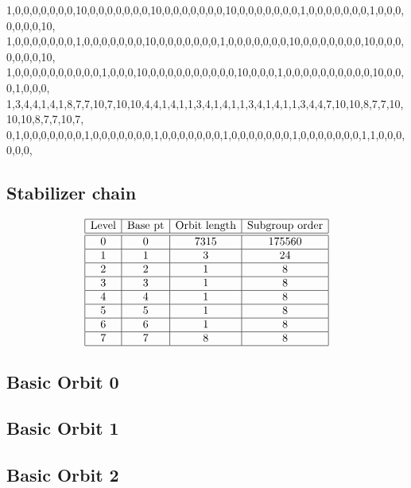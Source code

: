 {{1,0,0,0,0,0,0,0,10,0,0,0,0,0,0,0,10,0,0,0,0,0,0,0,10,0,0,0,0,0,0,0,1,0,0,0,0,0,0,0,1,0,0,0,0,0,0,0,10,\\
1,0,0,0,0,0,0,0,1,0,0,0,0,0,0,0,10,0,0,0,0,0,0,0,1,0,0,0,0,0,0,0,10,0,0,0,0,0,0,0,10,0,0,0,0,0,0,0,10,\\
1,0,0,0,0,0,0,0,0,0,0,1,0,0,0,10,0,0,0,0,0,0,0,0,0,0,10,0,0,0,1,0,0,0,0,0,0,0,0,0,0,10,0,0,0,1,0,0,0,\\
1,3,4,4,1,4,1,8,7,7,10,7,10,10,4,4,1,4,1,1,3,4,1,4,1,1,3,4,1,4,1,1,3,4,4,7,10,10,8,7,7,10,10,10,8,7,7,10,7,\\
0,1,0,0,0,0,0,0,0,1,0,0,0,0,0,0,0,1,0,0,0,0,0,0,0,1,0,0,0,0,0,0,0,1,0,0,0,0,0,0,0,1,1,0,0,0,0,0,0,\\
}

\subsection*{Stabilizer chain}


$$
\begin{array}{|c|c|c|c|}
\hline
\mbox{Level} & \mbox{Base pt} & \mbox{Orbit length} & \mbox{Subgroup order}\\
\hline
\hline
0 & 0 & 7315 & 175560\\
\hline
1 & 1 & 3 & 24\\
\hline
2 & 2 & 1 & 8\\
\hline
3 & 3 & 1 & 8\\
\hline
4 & 4 & 1 & 8\\
\hline
5 & 5 & 1 & 8\\
\hline
6 & 6 & 1 & 8\\
\hline
7 & 7 & 8 & 8\\
\hline
\end{array}
$$

\subsection*{Basic Orbit 0}



\bigskip

\subsection*{Basic Orbit 1}



\bigskip

\subsection*{Basic Orbit 2}

}

